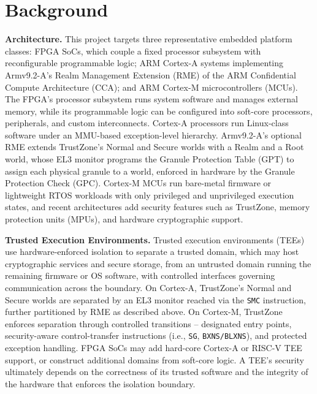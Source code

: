 \section{Background}
\textbf{Architecture.}
This project targets three representative embedded platform classes: FPGA SoCs, which couple a fixed processor subsystem with reconfigurable programmable logic; ARM Cortex-A systems implementing Armv9.2-A's Realm Management Extension (RME) of the ARM Confidential Compute Architecture (CCA); and ARM Cortex-M microcontrollers (MCUs).
The FPGA's processor subsystem runs system software and manages external memory, while its programmable logic can be configured into soft-core processors, peripherals, and custom interconnects.
Cortex-A processors run Linux-class software under an MMU-based exception-level hierarchy.
Armv9.2-A's optional RME extends TrustZone's Normal and Secure worlds with a Realm and a Root world, whose EL3 monitor programs the Granule Protection Table (GPT) to assign each physical granule to a world, enforced in hardware by the Granule Protection Check (GPC).
Cortex-M MCUs run bare-metal firmware or lightweight RTOS workloads with only privileged and unprivileged execution states, and recent architectures add security features such as TrustZone, memory protection units (MPUs), and hardware cryptographic support.

\textbf{Trusted Execution Environments.}
Trusted execution environments (TEEs) use hardware-enforced isolation to separate a trusted domain, which may host cryptographic services and secure storage, from an untrusted domain running the remaining firmware or OS software, with controlled interfaces governing communication across the boundary.
On Cortex-A, TrustZone's Normal and Secure worlds are separated by an EL3 monitor reached via the \texttt{SMC} instruction, further partitioned by RME as described above.
On Cortex-M, TrustZone enforces separation through controlled transitions -- designated entry points, security-aware control-transfer instructions (i.e., \texttt{SG}, \texttt{BXNS/BLXNS}), and protected exception handling.
FPGA SoCs may add hard-core Cortex-A or RISC-V TEE support, or construct additional domains from soft-core logic.
A TEE's security ultimately depends on the correctness of its trusted software and the integrity of the hardware that enforces the isolation boundary.

